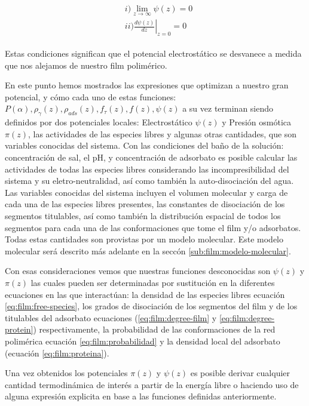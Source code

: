 \begin{align}
	\begin{aligned}
		&i)  \lim_{z\to\infty}\psi(z) = 0 \\
		&ii) \left.\frac{d\psi(z)}{dz}\right|_{z=0} = 0
		\label{eq:film:contorno}
	\end{aligned}
\end{align}

Estas condiciones significan que el potencial electrost\'atico se desvanece a medida que nos alejamos de nuestro film polim\'erico.

En este punto hemos mostrados las expresiones que optimizan a nuestro gran potencial, y c\'omo cada uno de estas funciones: $P(\alpha), \rho_\gamma(z),\rho_{ads}(z), f_\tau(z), f(z), \psi(z) $ a su vez  terminan siendo definidos por dos potenciales locales: Electrost\'atico $\psi(z)$ y Presi\'on osm\'otica $\pi(z)$, las actividades de las especies libres y algunas otras cantidades, que son variables conocidas del sistema.
Con las condiciones del ba\~no de la soluci\'on: concentraci\'on de sal, el pH, y concentraci\'on de adsorbato es posible calcular las actividades de todas las especies libres considerando las incompresibilidad del sistema y su eletro-neutralidad, as\'i como tambi\'en la auto-disociaci\'on del agua.  
Las variables conocidas del sistema incluyen el volumen molecular y carga de cada una de las especies libres presentes, las constantes de disociaci\'on de los segmentos titulables, as\'i como tambi\'en la distribuci\'on espacial de todos los segmentos para cada una de las conformaciones que tome el film y/o adsorbatos. Todas estas cantidades son provistas por un modelo molecular. Este modelo molecular ser\'a descrito m\'as adelante en la secc\'on \ref{sub:film:modelo-molecular}.

Con esas consideraciones vemos que nuestras funciones desconocidas son  $\psi(z)$ y $\pi(z)$ las cuales pueden ser determinadas por sustituci\'on en la diferentes ecuaciones en las que interact\'uan: la densidad de las especies libres ecuaci\'on  \ref{eq:film:free-species}, los grados de disociaci\'on de los segmentos del film y de los  titulables del adsorbato ecuaciones (\ref{eq:film:degree-film} y \ref{eq:film:degree-protein}) respectivamente, la probabilidad de las conformaciones de la red polim\'erica ecuaci\'on \ref{eq:film:probabilidad} y la densidad local del adsorbato (ecuaci\'on \ref{eq:film:proteina}).

Una vez obtenidos los potenciales $\pi(z)$ y $\psi(z)$ es posible derivar  cualquier cantidad termodin\'amica de inter\'es  a partir de la energ\'ia libre o haciendo uso de alguna expresi\'on explicita en base a las funciones definidas anteriormente.

